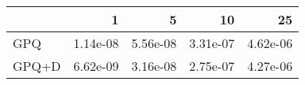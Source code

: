 \begin{tabular}{lrrrr}
\toprule
{} &        1 &        5 &       10 &       25 \\
\midrule
GPQ   & 1.14e-08 & 5.56e-08 & 3.31e-07 & 4.62e-06 \\
GPQ+D & 6.62e-09 & 3.16e-08 & 2.75e-07 & 4.27e-06 \\
\bottomrule
\end{tabular}
